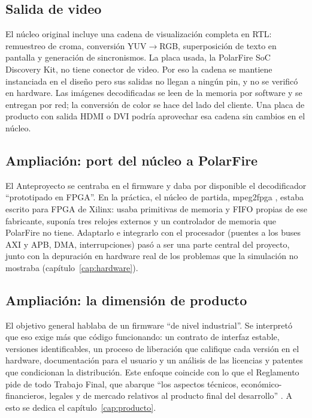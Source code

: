 \subsection{Salida de video}
\label{sec:redef-video}

El núcleo original incluye una cadena de visualización completa en RTL:
remuestreo de croma, conversión YUV$\to$RGB, superposición de texto en
pantalla y generación de sincronismos. La placa usada, la PolarFire SoC
Discovery Kit, no tiene conector de video. Por eso la cadena se mantiene
instanciada en el diseño pero sus salidas no llegan a ningún pin, y no se
verificó en hardware. Las imágenes decodificadas se leen de la memoria por
software y se entregan por red; la conversión de color se hace del lado del
cliente. Una placa de producto con salida HDMI o DVI podría aprovechar esa
cadena sin cambios en el núcleo.

\subsection{Ampliación: port del núcleo a PolarFire}
\label{sec:redef-port}

El Anteproyecto se centraba en el firmware y daba por disponible el
decodificador \enquote{prototipado en FPGA}. En la práctica, el núcleo de
partida, mpeg2fpga \citep{De_Vleeschauwer_2017}, estaba escrito para FPGA de
Xilinx: usaba primitivas de memoria y FIFO propias de ese fabricante,
suponía tres relojes externos y un controlador de memoria que PolarFire no
tiene. Adaptarlo e integrarlo con el procesador (puentes a los buses AXI y
APB, DMA, interrupciones) pasó a ser una parte central del proyecto, junto
con la depuración en hardware real de los problemas que la simulación no
mostraba (capítulo~\ref{cap:hardware}).

\subsection{Ampliación: la dimensión de producto}
\label{sec:redef-producto}

El objetivo general hablaba de un firmware \enquote{de nivel industrial}. Se
interpretó que eso exige más que código funcionando: un contrato de
interfaz estable, versiones identificables, un proceso de liberación que
califique cada versión en el hardware, documentación para el usuario y un
análisis de las licencias y patentes que condicionan la distribución. Este
enfoque coincide con lo que el Reglamento pide de todo Trabajo Final, que
abarque \enquote{los aspectos técnicos, económico-financieros, legales y de
mercado relativos al producto final del desarrollo} \citep[punto
1.2]{UTN_FRLR_2023_reglamento}. A esto se dedica el
capítulo~\ref{cap:producto}.

